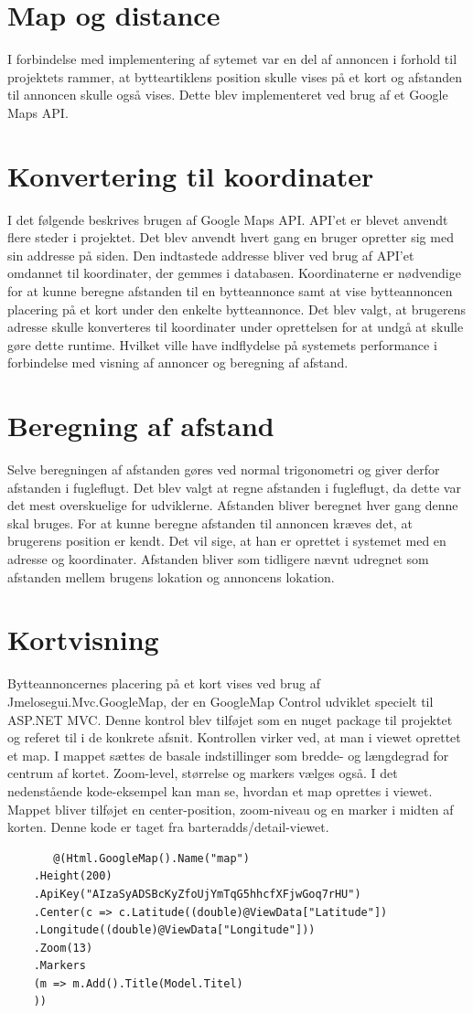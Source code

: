\section{Map og distance}
I forbindelse med implementering af sytemet var en del af annoncen i forhold til projektets rammer, at bytteartiklens position skulle vises på et kort og afstanden til annoncen skulle også vises. Dette blev implementeret ved brug af et Google Maps API.
\section{Konvertering til koordinater}
I det følgende beskrives brugen af Google Maps API. API'et er blevet anvendt flere steder i projektet. Det blev anvendt hvert gang en bruger opretter sig med sin addresse på siden. Den indtastede addresse bliver ved brug af API'et omdannet til koordinater, der gemmes i databasen. Koordinaterne er nødvendige for at kunne beregne afstanden til en bytteannonce samt at vise bytteannoncen placering på et kort under den enkelte bytteannonce.
Det blev valgt, at brugerens adresse skulle konverteres til koordinater under oprettelsen for at undgå at skulle gøre dette runtime. Hvilket ville have indflydelse på systemets performance i forbindelse med visning af annoncer og beregning af afstand.

\section{Beregning af afstand}
Selve beregningen af afstanden gøres ved normal trigonometri og giver derfor afstanden i fugleflugt. Det blev valgt at regne afstanden i fugleflugt, da dette var det mest overskuelige for udviklerne. Afstanden bliver beregnet hver gang denne skal bruges. For at kunne beregne afstanden til annoncen kræves det, at brugerens position er kendt. Det vil sige, at han er oprettet i systemet med en adresse og koordinater. Afstanden bliver som tidligere nævnt udregnet som afstanden mellem brugens lokation og annoncens lokation.

\section{Kortvisning}
Bytteannoncernes placering på et kort vises ved brug af Jmelosegui.Mvc.GoogleMap, der en GoogleMap Control udviklet specielt til ASP.NET MVC. Denne kontrol blev tilføjet som en nuget package til projektet og referet til i de konkrete afsnit. Kontrollen virker ved, at man i viewet oprettet et map. I mappet sættes de basale indstillinger som bredde- og længdegrad for centrum af kortet. Zoom-level, størrelse og markers vælges også.
I det nedenstående kode-eksempel kan man se, hvordan et map oprettes i viewet. Mappet bliver tilføjet en center-position, zoom-niveau og en marker i midten af korten. Denne kode er taget fra barteradds/detail-viewet.
\begin{verbatim}
	   @(Html.GoogleMap().Name("map")
	.Height(200)
	.ApiKey("AIzaSyADSBcKyZfoUjYmTqG5hhcfXFjwGoq7rHU")
	.Center(c => c.Latitude((double)@ViewData["Latitude"])
	.Longitude((double)@ViewData["Longitude"]))
	.Zoom(13)
	.Markers
	(m => m.Add().Title(Model.Titel)
	))
\end{verbatim}

